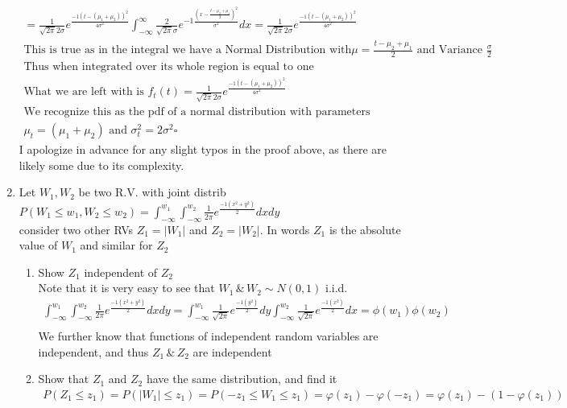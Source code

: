 \documentclass[11pt]{article}
\begin{document}
\begin{enumerate}
\begin{gather}
	=\frac{1}{\sqrt{2\pi}2\sigma}e^{\frac{-1(t-(\mu_1+\mu_2))^2}{4\sigma^2}}\int_{-\infty}^{\infty} \frac{2}{\sqrt{2\pi}\sigma}e^{-1\frac{(x-\frac{t-\mu_2+\mu_1}{2})^2 }{\sigma^2}}dx
	=\frac{1}{\sqrt{2\pi}2\sigma}e^{\frac{-1(t-(\mu_1+\mu_2))^2}{4\sigma^2}}
	\\
	\text{This is true as in the integral we have a Normal Distribution with} \mu = \frac{t-\mu_2+\mu_1}{2} \text{ and Variance } \frac{\sigma}{2}
	\\
	\text{Thus when integrated over its whole region is equal to one}
	\\
	\text{What we are left with is } f_t(t) = \frac{1}{\sqrt{2\pi}2\sigma}e^{\frac{-1(t-(\mu_1+\mu_2))^2}{4\sigma^2}}\\
	\text{We recognize this as the pdf of a normal distribution with parameters} \\
	\mu_t = (\mu_1+\mu_2) \text{ and } \sigma_t^2 = 2\sigma^2 \square
\end{gather}
I apologize in advance for any slight typos in the proof above, as there are likely some due to its complexity.   
\item Let $W_1, W_2$ be two R.V. with joint distrib\\
$P(W_1\le w_1, W_2 \le w_2) = \int_{-\infty}^{w_1}\int_{-\infty}^{w_2} \frac{1}{2\pi}e^{\frac{-1(x^2+y^2)}{2}}dxdy$\\
consider two other RVs $Z_1 = |W_1|$ and $Z_2=|W_2|$. In words $Z_1$ is the absolute value of $W_1$ and similar for $Z_2$
\begin{enumerate}
	\item Show $Z_1$ independent of $Z_2$
	\\
	Note that it is very easy to see that $W_1 \, \& \, W_2 \sim N(0,1)$ i.i.d.
	\begin{gather}
		\int_{-\infty}^{w_1}\int_{-\infty}^{w_2} \frac{1}{2\pi}e^{\frac{-1(x^2+y^2)}{2}}dxdy = \int_{-\infty}^{w_1}\frac{1}{\sqrt{2\pi}}e^{\frac{-1(y^2)}{2}}dy\int_{-\infty}^{w_2} \frac{1}{\sqrt{2\pi}}e^{\frac{-1(x^2)}{2}}dx =\phi(w_1)\phi(w_2)\\
	\end{gather}
	We further know that functions of independent random variables are independent, and thus $Z_1 \, \& \, Z_2$ are independent
	\item Show that $Z_1$ and $Z_2$ have the same distribution, and find it
	\begin{gather}
		P(Z_1\le z_1) = P(|W_1|\le z_1) = P( -z_1 \le W_1 \le z_1) = \varphi(z_1) - \varphi(-z_1) = \varphi(z_1) - (1- \varphi(z_1))\\

\end{gather}
\end{enumerate}
\end{enumerate}
\end{document}
